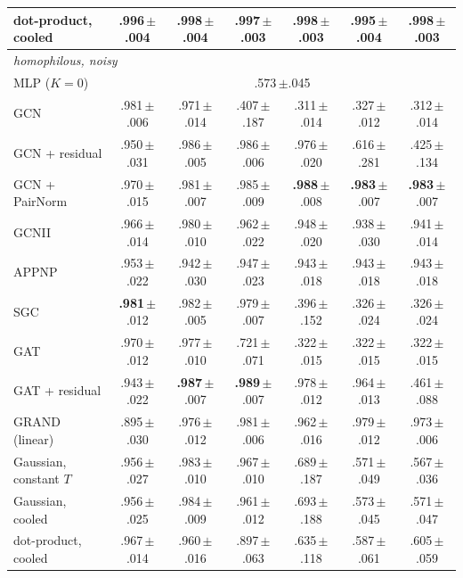 \begin{tabular}{lcccccc}
dot-product, cooled & .996\,{\tiny$\pm$.004} & .998\,{\tiny$\pm$.004} & .997\,{\tiny$\pm$.003} & .998\,{\tiny$\pm$.003} & .995\,{\tiny$\pm$.004} & .998\,{\tiny$\pm$.003}\\
\midrule
\multicolumn{7}{l}{\emph{homophilous, noisy}}\\
MLP ($K=0$) & \multicolumn{6}{c}{.573\,{\tiny$\pm$.045}}\\
GCN & .981\,{\tiny$\pm$.006} & .971\,{\tiny$\pm$.014} & .407\,{\tiny$\pm$.187} & .311\,{\tiny$\pm$.014} & .327\,{\tiny$\pm$.012} & .312\,{\tiny$\pm$.014}\\
GCN + residual & .950\,{\tiny$\pm$.031} & .986\,{\tiny$\pm$.005} & .986\,{\tiny$\pm$.006} & .976\,{\tiny$\pm$.020} & .616\,{\tiny$\pm$.281} & .425\,{\tiny$\pm$.134}\\
GCN + PairNorm & .970\,{\tiny$\pm$.015} & .981\,{\tiny$\pm$.007} & .985\,{\tiny$\pm$.009} & \textbf{.988}\,{\tiny$\pm$.008} & \textbf{.983}\,{\tiny$\pm$.007} & \textbf{.983}\,{\tiny$\pm$.007}\\
GCNII & .966\,{\tiny$\pm$.014} & .980\,{\tiny$\pm$.010} & .962\,{\tiny$\pm$.022} & .948\,{\tiny$\pm$.020} & .938\,{\tiny$\pm$.030} & .941\,{\tiny$\pm$.014}\\
APPNP & .953\,{\tiny$\pm$.022} & .942\,{\tiny$\pm$.030} & .947\,{\tiny$\pm$.023} & .943\,{\tiny$\pm$.018} & .943\,{\tiny$\pm$.018} & .943\,{\tiny$\pm$.018}\\
SGC & \textbf{.981}\,{\tiny$\pm$.012} & .982\,{\tiny$\pm$.005} & .979\,{\tiny$\pm$.007} & .396\,{\tiny$\pm$.152} & .326\,{\tiny$\pm$.024} & .326\,{\tiny$\pm$.024}\\
GAT & .970\,{\tiny$\pm$.012} & .977\,{\tiny$\pm$.010} & .721\,{\tiny$\pm$.071} & .322\,{\tiny$\pm$.015} & .322\,{\tiny$\pm$.015} & .322\,{\tiny$\pm$.015}\\
GAT + residual & .943\,{\tiny$\pm$.022} & \textbf{.987}\,{\tiny$\pm$.007} & \textbf{.989}\,{\tiny$\pm$.007} & .978\,{\tiny$\pm$.012} & .964\,{\tiny$\pm$.013} & .461\,{\tiny$\pm$.088}\\
GRAND (linear) & .895\,{\tiny$\pm$.030} & .976\,{\tiny$\pm$.012} & .981\,{\tiny$\pm$.006} & .962\,{\tiny$\pm$.016} & .979\,{\tiny$\pm$.012} & .973\,{\tiny$\pm$.006}\\
Gaussian, constant $T$ & .956\,{\tiny$\pm$.027} & .983\,{\tiny$\pm$.010} & .967\,{\tiny$\pm$.010} & .689\,{\tiny$\pm$.187} & .571\,{\tiny$\pm$.049} & .567\,{\tiny$\pm$.036}\\
Gaussian, cooled & .956\,{\tiny$\pm$.025} & .984\,{\tiny$\pm$.009} & .961\,{\tiny$\pm$.012} & .693\,{\tiny$\pm$.188} & .573\,{\tiny$\pm$.045} & .571\,{\tiny$\pm$.047}\\
dot-product, cooled & .967\,{\tiny$\pm$.014} & .960\,{\tiny$\pm$.016} & .897\,{\tiny$\pm$.063} & .635\,{\tiny$\pm$.118} & .587\,{\tiny$\pm$.061} & .605\,{\tiny$\pm$.059}\\
\bottomrule
\end{tabular}

